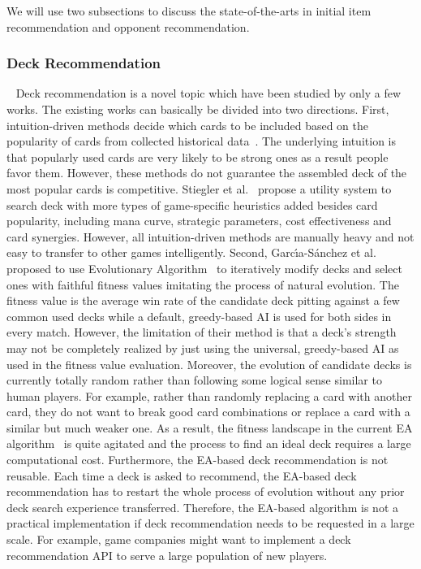 We will use two subsections to discuss the state-of-the-arts in initial item recommendation and opponent recommendation.


\subsubsection{Deck Recommendation}~\label{deckrec_prev}
Deck recommendation is a novel topic which have been studied by only a few works. The existing works can basically be divided into two directions. First, intuition-driven methods decide which cards to be included based on the popularity of cards from collected historical data~\cite{frankkarsten,willfancher}. The underlying intuition is that popularly used cards are very likely to be strong ones as a result people favor them. However, these methods do not guarantee the assembled deck of the most popular cards is competitive. Stiegler et al.~\cite{stiegler2016hearthstone} propose a utility system to search deck with more types of game-specific heuristics added besides card popularity, including mana curve, strategic parameters, cost effectiveness and card synergies. However, all intuition-driven methods are manually heavy and not easy to transfer to other games intelligently. Second, Garc{\'\i}a-S{\'a}nchez et al.~\cite{garcia2016evolutionary} proposed to use Evolutionary Algorithm~\cite{simon2013evolutionary} to iteratively modify decks and select ones with faithful fitness values imitating the process of natural evolution. The fitness value is the average win rate of the candidate deck pitting against a few common used decks while a default, greedy-based AI is used for both sides in every match. However, the limitation of their method is that a deck's strength may not be completely realized by just using the universal, greedy-based AI as used in the fitness value evaluation. Moreover, the evolution of candidate decks is currently totally random
rather than following some logical sense similar to human players. For example, rather than randomly replacing a card with another card, they do not want to break good card combinations or replace a card with a similar but much weaker one. As a result, the fitness landscape in the current EA algorithm~\cite{garcia2016evolutionary} is quite agitated and the process to find an ideal deck requires a large computational cost. Furthermore, the EA-based deck recommendation is not reusable. Each time a deck is asked to recommend, the EA-based deck recommendation has to restart the whole process of evolution without any prior deck search experience transferred. Therefore, the EA-based algorithm is not a practical implementation if deck recommendation needs to be requested in a large scale. For example, game companies might want to implement a deck recommendation API to serve a large population of new players.


